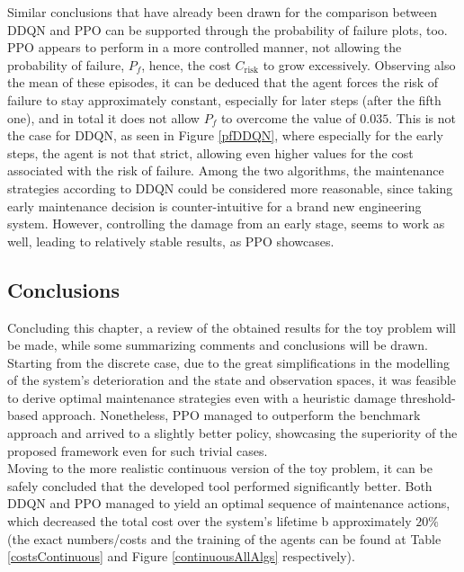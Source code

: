 Similar conclusions that have already been drawn for the comparison between \gls{DDQN} and \gls{PPO} can be supported through the probability of failure plots, too. \gls{PPO} appears to perform in a more controlled manner, not allowing the probability of failure, $P_f$, hence, the cost $C_{\text{risk}}$ to grow excessively. Observing also the mean of these episodes, it can be deduced that the agent forces the risk of failure to stay approximately constant, especially for later steps (after the fifth one), and in total it does not allow $P_f$ to overcome the value of $0.035$. This is not the case for \gls{DDQN}, as seen in Figure \ref{pfDDQN}, where especially for the early steps, the agent is not that strict, allowing even higher values for the cost associated with the risk of failure. Among the two algorithms, the maintenance strategies according to \gls{DDQN} could be considered more reasonable, since taking early maintenance decision is counter-intuitive for a brand new engineering system. However, controlling the damage from an early stage, seems to work as well, leading to relatively stable results, as \gls{PPO} showcases.


\subsection{Conclusions}

Concluding this chapter, a review of the obtained results for the toy problem will be made, while some summarizing comments and conclusions will be drawn. \\

Starting from the discrete case, due to the great simplifications in the modelling of the system's deterioration and the state and observation spaces, it was feasible to derive optimal maintenance strategies even with a heuristic damage threshold-based approach. Nonetheless, \gls{PPO} managed to outperform the benchmark approach and arrived to a slightly better policy, showcasing the superiority of the proposed framework even for such trivial cases.\\

Moving to the more realistic continuous version of the toy problem, it can be safely concluded that the developed tool performed significantly better. Both \gls{DDQN} and \gls{PPO} managed to yield an optimal sequence of maintenance actions, which decreased the total cost over the system's lifetime b approximately $20\%$ (the exact numbers/costs and the training of the agents can be found at Table \ref{costsContinuous} and Figure \ref{continuousAllAlgs} respectively).\\


